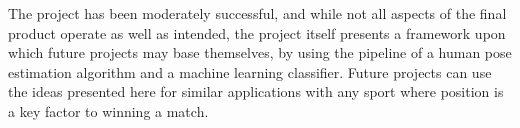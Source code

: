 \documentclass[a4paper, oneside, 11pt]{article}
\begin{document}
\bigskip
\noindent
The project has been moderately successful, and while not all aspects of the final product operate as well as intended, the project itself presents a framework upon which future projects may base themselves, by using the pipeline of a human pose estimation algorithm and a machine learning classifier. Future projects can use the ideas presented here for similar applications with any sport where position is a key factor to winning a match.


\newpage
{}

\printbibliography
\end{document}
